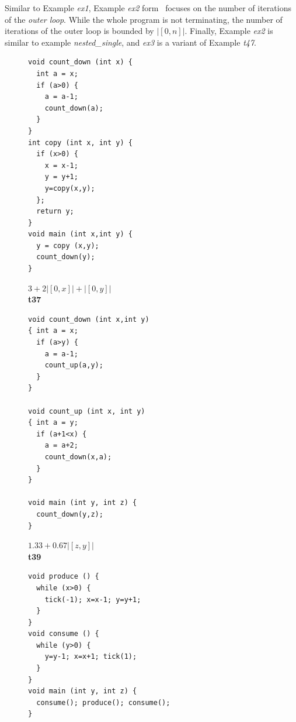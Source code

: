 \documentclass{sigplanconf}
\begin{document}
{Similar to Example \emph{ex1}, Example \emph{ex2}
form~\cite{GulwaniZ10} focuses on the number of iterations of the
\emph{outer loop}.  While the whole program is not terminating, the
number of iterations of the outer loop is bounded by $|[0,n]|$.
Finally, Example \emph{ex2} is similar to example
\emph{nested\_single}, and \emph{ex3} is a variant of Example
\emph{t47}.

\begin{figure}
 \setlength{\progwidth}{.28\linewidth}
  \centering
%
%
  \begin{minipage}[b]{\progwidth}
    \begin{center}
   \begin{lstlisting}
void count_down (int x) {
  int a = x;
  if (a>0) {
    a = a-1;
    count_down(a);
  }
}
int copy (int x, int y) {
  if (x>0) {
    x = x-1;
    y = y+1;
    y=copy(x,y);
  };
  return y;
}
void main (int x,int y) {
  y = copy (x,y);
  count_down(y);
}
   \end{lstlisting}

$3 + 2|[0, x]| + |[0, y]|$
\\[.7\baselineskip]
      {\bf t37}
    \end{center}
  \end{minipage}
%
%
  \begin{minipage}[b]{\progwidth}
    \begin{center}
   \begin{lstlisting}
void count_down (int x,int y)
{ int a = x;
  if (a>y) {
    a = a-1;
    count_up(a,y);
  }
}

void count_up (int x, int y)
{ int a = y;
  if (a+1<x) {
    a = a+2;
    count_down(x,a);
  }
}

void main (int y, int z) {
  count_down(y,z);
}
   \end{lstlisting}

$1.33 + 0.67 |[z,y]|$
\\[.7\baselineskip]
      {\bf t39}
    \end{center}
  \end{minipage}
%
%
  \begin{minipage}[b]{\progwidth}
    \begin{center}
   \begin{lstlisting}
void produce () {
  while (x>0) {
    tick(-1); x=x-1; y=y+1;
  }
}
void consume () {
  while (y>0) {
    y=y-1; x=x+1; tick(1);
  }
}
void main (int y, int z) {
  consume(); produce(); consume();
}
   \end{lstlisting}


\end{center}
\end{minipage}
\end{figure}}
\end{document}
